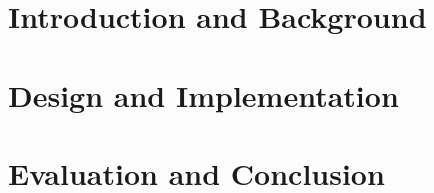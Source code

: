 \documentclass[USenglish,parskip=full]{ifimaster}
\begin{document}
\tableofcontents

\listoftables

\listoffigures

\mainmatter{}

\part{Introduction and Background}




\part{Design and Implementation}


\part{Evaluation and Conclusion}

%

\appendix{}
%

\backmatter{}
\printbibliography
\end{document}
